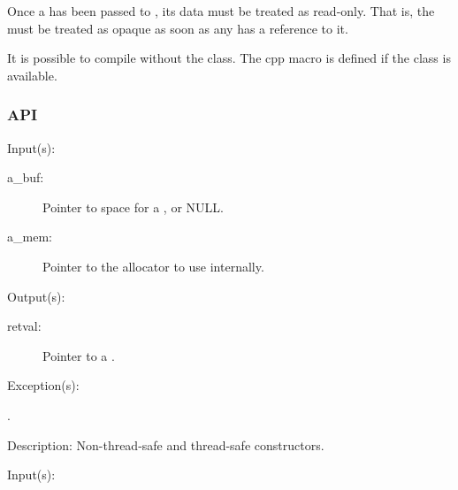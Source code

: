 Once a  has been passed to ,
its data must be treated as read-only.  That is, the  must be
treated as opaque as soon as any  has a reference to it.

\label{_CW_HAVE_LIBSTASH_BUF}
It is possible to compile  without the  class.
The  cpp macro is defined if the
 class is available.

\subsubsection{API}
\begin{capi}
\label{buf_new}
\label{buf_new_r}
	\begin{capilist}
	\item[Input(s): ]
		\begin{description}\item[]
		\item[a\_buf: ]
			Pointer to space for a , or NULL.
		\item[a\_mem: ]
			Pointer to the allocator to use internally.
		\end{description}
	\item[Output(s): ]
		\begin{description}\item[]
		\item[retval: ]
			Pointer to a .
		\end{description}
	\item[Exception(s): ]
		\begin{description}\item[]
		\item[.]
		\end{description}
	\item[Description: ]
		Non-thread-safe and thread-safe constructors.
	\end{capilist}
\label{buf_delete}
	\begin{capilist}
	\item[Input(s): ]

\end{capilist}
\end{capi}
